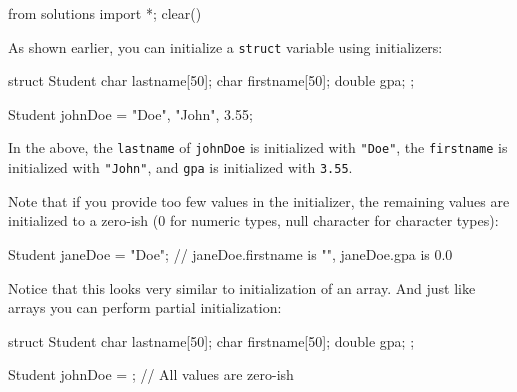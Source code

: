 \begin{python0}
from solutions import *; clear()
\end{python0}

As shown earlier, you can initialize a \texttt{struct} variable using initializers:

\begin{consolethree}[escapeinside=||]
struct Student
{
    char lastname[50];
    char firstname[50];
    double gpa;
};

Student johnDoe = {"Doe", "John", 3.55};
\end{consolethree}

In the above, the \texttt{lastname} of \texttt{johnDoe} is initialized
with \verb!"Doe"!, the \texttt{firstname} is initialized with
\verb!"John"!, and \texttt{gpa} is initialized with \texttt{3.55}.

Note that if you provide too few values in the initializer, the remaining
values are initialized to a zero-ish (0 for numeric types, null character
for character types):

\begin{consolethree}[escapeinside=||]
Student janeDoe = {"Doe"};
// janeDoe.firstname is "", janeDoe.gpa is 0.0
\end{consolethree}

Notice that this looks very similar to initialization of an array. And just like
arrays you can perform partial initialization:

\begin{consolethree}[escapeinside=||]
struct Student
{
    char lastname[50];
    char firstname[50];
    double gpa;
};

Student johnDoe = {}; // All values are zero-ish
\end{consolethree}


